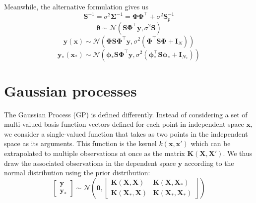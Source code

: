 \documentclass{article}
\begin{document}
Meanwhile, the alternative formulation gives us 
\begin{equation}
\label{eq:define_S}
    \mathbf{S}^{-1} = \sigma^2\boldsymbol{\Sigma}^{-1}=\boldsymbol{\Phi \Phi}^\top + \sigma^2\mathbf{S}_p^{-1}
\end{equation}
\begin{equation}
\label{theta_distribution}
    \boldsymbol{\theta}\sim\mathcal{N}( \mathbf{S} \boldsymbol{\Phi}^\top \mathbf{y},\sigma^2\mathbf{S})
\end{equation} 
\begin{equation}
\label{BLR_posterior}
    \mathbf{y}(\mathbf{x})\sim\mathcal{N}\left(\boldsymbol{\Phi}  \mathbf{S} \boldsymbol{\Phi}^\top\mathbf{y} ,\sigma^2\left(\boldsymbol{\Phi}^\top\mathbf{S}\boldsymbol{\Phi}+\mathbf{I}_N\right)\right)
\end{equation} 
\begin{equation}
\label{BLR_posterior}
    \mathbf{y_\ast}(\mathbf{x}_\ast)\sim\mathcal{N}\left(\boldsymbol{\phi}_\ast  \mathbf{S} \boldsymbol{\Phi}^\top\mathbf{y} ,\sigma^2\left(\boldsymbol{\phi}^\top_\ast \mathbf{S}\boldsymbol{\phi}_\ast+ \mathbf{I}_{N_\ast}\right)\right)
\end{equation} 

\section{Gaussian processes}

The Gaussian Process (GP) is defined differently. Instead of considering a set of multi-valued basis function vectors defined for each point in independent space $\mathbf{x}$, we consider a single-valued function that takes as two points in the independent space as its arguments. This function is the kernel $k(\mathbf{x},\mathbf{x}')$ which can be extrapolated to multiple observations at once as the matrix $\mathbf{K}(\mathbf{X},\mathbf{X}')$. We thus draw the associated observations in the dependent space $\mathbf{y}$ according to the normal distribution using the prior distribution:
\begin{equation}
    \begin{bmatrix}
    \mathbf{y} \\
    \mathbf{y_\ast}
    \end{bmatrix} \sim
    \mathcal{N}\left(\mathbf{0},
    \begin{bmatrix}
    \mathbf{K}(\mathbf{X},\mathbf{X}) & \mathbf{K}(\mathbf{X},\mathbf{X}_\ast) \\
    \mathbf{K}(\mathbf{X}_\ast,\mathbf{X}) & \mathbf{K}(\mathbf{X}_\ast,\mathbf{X}_\ast)
    \end{bmatrix}\right)
\end{equation} 
\end{document}
